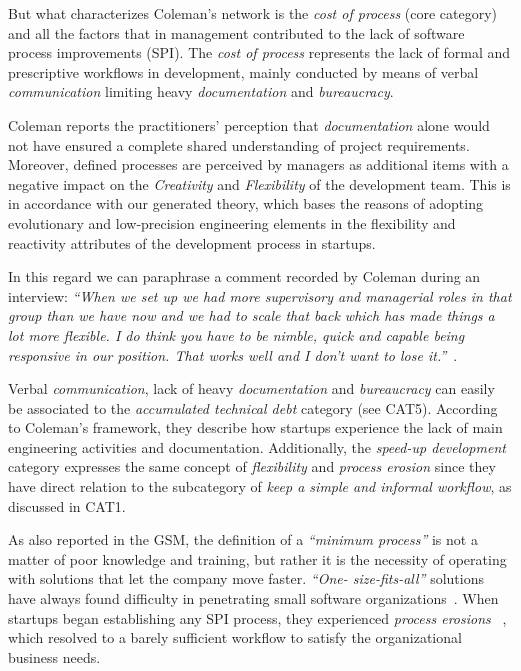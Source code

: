 \documentclass[10pt,journal,letterpaper,compsoc]{IEEEtran}
\begin{document}
But what characterizes Coleman's network is the \textit{cost of process} (core
category) and all the factors that in management contributed to the lack of
software process improvements (SPI). The \textit{cost of process} represents the
lack of formal and prescriptive workflows in development, mainly conducted by
means of verbal \textit{communication} limiting heavy \textit{documentation} and
\textit{bureaucracy}.

Coleman reports the practitioners' perception that \textit{documentation} alone
would not have ensured a complete shared understanding of project requirements.
Moreover, defined processes are perceived by managers as additional items with a
negative impact on the \textit{Creativity} and \textit{Flexibility} of the
development team. This is in accordance with our generated theory, which bases
the reasons of adopting evolutionary and low-precision engineering elements in
the flexibility and reactivity attributes of the development process in
startups.

In this regard we can paraphrase a comment recorded by Coleman during an
interview: \textit{``When we set up we had more supervisory and managerial roles
in that group than we have now and we had to scale that back which has made
things a lot more flexible. I do think you have to be nimble, quick and capable
being responsive in our position. That works well and I don't want to lose
it.''}~\cite{Coleman2007}.

Verbal \textit{communication}, lack of heavy \textit{documentation} and
\textit{bureaucracy} can easily be associated to the \textit{accumulated
technical debt} category (see CAT5). According to Coleman's framework, they
describe how startups experience the lack of main engineering activities and
documentation. Additionally, the \textit{speed-up development} category
expresses the same concept of \textit{flexibility} and \textit{process erosion}
since they have direct relation to the subcategory of \textit{keep a simple and
informal workflow}, as discussed in CAT1.

As also reported in the GSM, the definition of a \textit{``minimum process''}
is not a matter of poor knowledge and training, but rather it is the necessity
of operating with solutions that let the company move faster. \textit{``One-
size-fits-all''} solutions have always found difficulty in penetrating small
software organizations~\cite{Staples2007}. When startups began establishing any
SPI process, they experienced \textit{process erosions}~\cite{Coleman2008}
, which resolved to a barely sufficient workflow to satisfy the organizational 
business needs.
\end{document}
